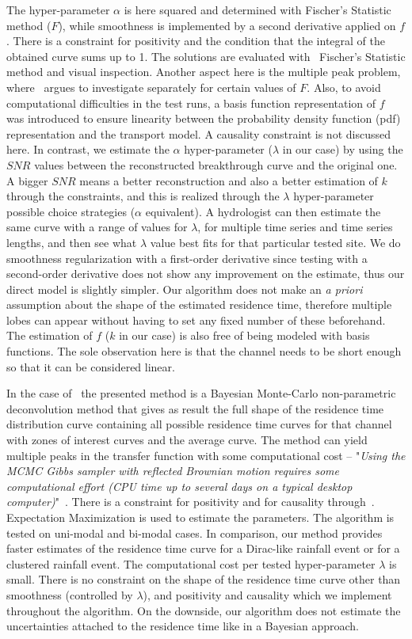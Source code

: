 \documentclass[]{elsarticle} %
\begin{document}
The hyper-parameter $\alpha$ is here squared and determined with Fischer's Statistic method ($F$), while smoothness is implemented by a second derivative applied on $f$. There is a constraint for positivity and the condition that the integral of the obtained curve sums up to 1. The solutions are evaluated with~\cite{Provencher1982a} Fischer's Statistic method and visual inspection. Another aspect here is the multiple peak problem, where~\cite{Provencher1982a} argues to investigate separately for certain values of $F$. Also, to avoid computational difficulties in the test runs, a basis function representation of $f$ was introduced to ensure linearity between the probability density function (pdf) representation and the transport model. A causality constraint is not discussed here. In contrast, we estimate the $\alpha$ hyper-parameter ($\lambda$ in our case) by using the $SNR$ values between the reconstructed breakthrough curve and the original one. A bigger $SNR$ means a better reconstruction and also a better estimation of $k$ through the constraints, and this is realized through the $\lambda$ hyper-parameter possible choice strategies ($\alpha$ equivalent). A hydrologist can then estimate the same curve with a range of values for $\lambda$, for multiple time series and time series lengths, and then see what $\lambda$ value best fits for that particular tested site. We do smoothness regularization with a first-order derivative since testing with a second-order derivative does not show any improvement on the estimate, thus our direct model is slightly simpler. Our algorithm does not make an \textit{a priori} assumption about the shape of the estimated residence time, therefore multiple lobes can appear without having to set any fixed number of these beforehand. The estimation of $f$ ($k$ in our case) is also free of being modeled with basis functions. The sole observation here is that the channel needs to be short enough so that it can be considered linear.

In the case of~\cite{Fienen2006} the presented method is a Bayesian Monte-Carlo non-parametric deconvolution method that gives as result the full shape of the residence time distribution curve containing all possible residence time curves for that channel with zones of interest curves and the average curve. The method can yield multiple peaks in the transfer function with some computational cost -- "\textit{Using the MCMC Gibbs sampler with reflected Brownian motion requires some computational effort (CPU time up to several days on a typical desktop computer)}"~\cite{Fienen2006}. There is a constraint for positivity and for causality through~\cite{Michalak2003}. Expectation Maximization is used to estimate the parameters. The algorithm is tested on uni-modal and bi-modal cases. In comparison, our method provides faster estimates of the residence time curve for a Dirac-like rainfall event or for a clustered rainfall event. The computational cost per tested hyper-parameter $\lambda$ is small. There is no constraint on the shape of the residence time curve other than smoothness (controlled by $\lambda$), and positivity and causality which we implement throughout the algorithm. On the downside, our algorithm does not estimate the uncertainties attached to the residence time like in a Bayesian approach.
\end{document}
